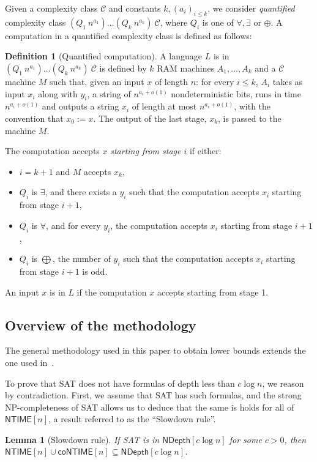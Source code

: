 \documentclass[a4paper, 11pt]{article}
\theoremstyle{plain}
\newtheorem{lemma}[theorem]{Lemma}
\theoremstyle{definition}
\newtheorem{definition}[theorem]{Definition}
\theoremstyle{remark}
\newcommand{\Cc}{\mathcal{C}}%
\newcommand{\Ff}{\mathcal{F}}%
\newcommand{\NP}{\textsf{NP}}%
\newcommand{\NTIME}{\textsf{NTIME}}%
\newcommand{\coNTIME}{\textsf{coNTIME}}%
\newcommand{\SAT}{\textsf{SAT}}%
\newcommand{\ND}{\textsf{NDepth}}%
\newcommand{\NDL}[1]{\ND[ #1 \log n]}%
\begin{document}
Given a complexity class $\Cc$ and constants $k, (a_i)_{i\leq k}$, 
we consider \textit{quantified} complexity
class $(Q_1~n^{a_1})\ldots(Q_k~n^{a_k})~\Cc$, 
where $Q_i$ is one of $\forall, \exists$ or $\oplus$.
A computation in a quantified complexity class is defined as follows:
\begin{definition}[Quantified computation]
	A language $L$ is in $(Q_1~n^{a_1})\ldots(Q_k~n^{a_k})~\Cc$ 
	is defined by $k$ RAM machines $A_1, \ldots, A_k$ and a $\Cc$ machine $M$
	such that, given an input $x$ of length $n$:
	for every $i \le k$, $A_{i}$ takes as input $x_i$ along with $y_i$, 
	a string of $n^{a_{i} + o(1)}$ nondeterministic bits,
	runs in time $n^{a_{i} + o(1)}$ and outputs a string $x_{i}$ of length at most $n^{a_{i} + o(1)}$, 
	with the convention that $x_0 := x$.
	The output of the last stage, $x_{k}$, is passed to the machine $M$. 

	The computation accepts $x$ \textit{starting from stage $i$} if either:
	\begin{itemize}
		\item $i = k+1$ and $M$ accepts $x_{k}$, 
		\item $Q_i$ is $\exists$, and there exists a $y_i$ such that the computation
		accepts $x_{i}$ starting from stage $i+1$, 
		\item $Q_i$ is $\forall$, and for every $y_i$, the computation
		accepts $x_{i}$ starting from stage $i+1$, 
		\item $Q_i$ is $\bigoplus$, the number of $y_i$ such that the computation
		accepts $x_{i}$ starting from stage $i+1$ is odd. 
	\end{itemize}

	An input $x$ is in $L$ if the computation $x$ accepts starting from stage 1.
\end{definition}

\subsection{Overview of the methodology}

The general methodology used in this paper to obtain lower bounds
extends the one used in~\cite{mudigonda2020time}.

To prove that \SAT{} does not have formulas of depth less than $c\log n$, 
we reason by contradiction.
First, we assume that \SAT{} has such formulas, and the strong \NP-completeness of \SAT{}
allows us to deduce that the same is holds for all of $\NTIME[n]$, 
a result referred to as the ``Slowdown rule''.
\begin{lemma}[Slowdown rule]
	If \SAT{} is in $\NDL{c}$ for some $c>0$,
	then $\NTIME[n] \cup \coNTIME[n] \subseteq \NDL{c}$.
\end{lemma}
\end{document}
